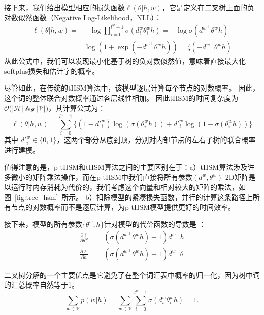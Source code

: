 接下来，我们给出模型相应的损失函数$ \ell(\theta | h,w)$，它是定义在二叉树上面的负对数似然函数（Negative Log-Likelihood，NLL）：
\begin{equation}\label{equ:cost}
\begin{split}
   \ell(\theta|h,w) =&-\log\prod_{i=0}^{l^w -1} \sigma(d_i^w \theta_{i}^w h) = -\log \sigma({d^w}^\top \theta^w h)\\
    =& \log (1+\exp(- {d^w}^\top \theta^w h )) =  \zeta(- {d^w}^\top \theta^w h )
\end{split}
\end{equation}
从此公式中，我们可以发现最小化基于树的负对数似然值，意味着直接最大化softplus损失和估计字的概率。

尽管如此，在传统的tHSM算法中，该模型逐层计算每个节点的对数概率。 因此，这个词的整体联合对数概率通过各层线性相加。 因此tHSM的时间复杂度为$\mathcal{O(|H|\log|V|})$，其计算公式为：
\begin{equation}
\ell(\theta|h,w) =\sum_{i=0}^{l^w-1} \{(1-d'^w_i)\log (\sigma(\theta_{i}^w h))  + {d'^w_i}\log (1-\sigma (\theta_{i}^w h))\}
\end{equation}
其中 $d'^w_i\in \{0,1\}$，这两个部分从底到顶，分别对内部节点的左右子树的联合概率进行建模。

值得注意的是，p-tHSM和tHSM算法之间的主要区别在于：a）tHSM算法涉及许多微小的矩阵乘法操作，而在p-tHSM中我们直接将所有参数$(d^w,\theta^w)$ 2D矩阵是以运行时内存消耗为代价的，我们考虑这个向量和相对较大的矩阵的乘法，如图~\ref{fig:tree_hsm}~所示。 b）扣除模型的紧凑损失函数，并行的计算这条路径上所有节点的对数概率而不是逐层计算，为p-tHSM模型提供更好的时间效率。

接下来，模型的所有参数$\{\theta^w,h\}$针对模型的代价函数的导数是 ：
\begin{equation}
\begin{split}
\frac{\partial \ell}{\partial \theta^w}=&(\sigma({d^w}^\top\theta^w h) -1){d^w}^\top h \\
\frac{\partial \ell}{\partial h}=&(\sigma({d^w}^\top \theta^w h) -1){d^w}^\top \theta
\end{split}
\end{equation}


二叉树分解的一个主要优点是它避免了在整个词汇表中概率的归一化，因为树中词的汇总概率自然等于1。
\begin{equation}
\sum_{w\in \mathcal{V}}{p(w|h)}=\sum_{w \in \mathcal{V}}\sum_{i=0}^{l^w-1}{\sigma(d_i^w\theta_{i}^w h)}=1.
\end{equation}




